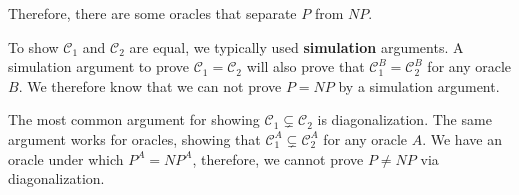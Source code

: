 Therefore, there are some oracles that separate $P$ from $NP$.

To show $\mathcal{C}_1$ and $\mathcal{C}_2$ are equal, we typically used \textbf{simulation} arguments.  A simulation argument to prove $\mathcal{C}_1 = \mathcal{C}_2$ will also prove that $\mathcal{C}_1^B=\mathcal{C}_2^B$ for any oracle $B$.  We therefore know that we can not prove $P=NP$ by a simulation argument.  

The most common argument for showing $\mathcal{C}_1 \subsetneq \mathcal{C}_2$ is diagonalization.  The same argument works for oracles, showing that $\mathcal{C}_1^A\subsetneq \mathcal{C}_2^A$ for any oracle $A$.  We have an oracle under which $P^A=NP^A$, therefore, we cannot prove $P\neq NP$ via diagonalization.
	



